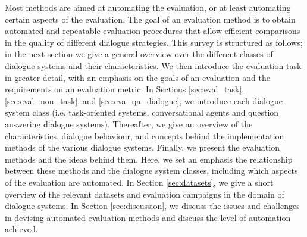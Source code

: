 Most methods are aimed at automating the evaluation, or at least automating certain aspects of the evaluation. The goal of an evaluation method is to obtain automated and repeatable evaluation procedures that allow efficient comparisons in the quality of different dialogue strategies. 
This survey is structured as follows; in the next section we give a general overview over the different classes of dialogue systems and their characteristics. We then introduce the evaluation task in greater detail, with an emphasis on the goals of an evaluation and the requirements on an evaluation metric. In Sections \ref{sec:eval_task}, \ref{sec:eval_non_task}, and \ref{sec:eva_qa_dialogue}, we introduce each dialogue system class (i.e. task-oriented systems, conversational agents and question answering dialogue systems). Thereafter, we give an overview of the characteristics, dialogue behaviour, and concepts behind the implementation methods of the various dialogue systems. Finally, we present the evaluation methods and the ideas behind them. Here, we set an emphasis the relationship between these methods and the dialogue system classes, including which aspects of the evaluation are automated. In Section \ref{sec:datasets}, we give a short overview of the relevant datasets and evaluation campaigns in the domain of dialogue systems. In Section \ref{sec:discussion}, we discuss the issues and challenges in devising automated evaluation methods and discuss the level of automation achieved.



